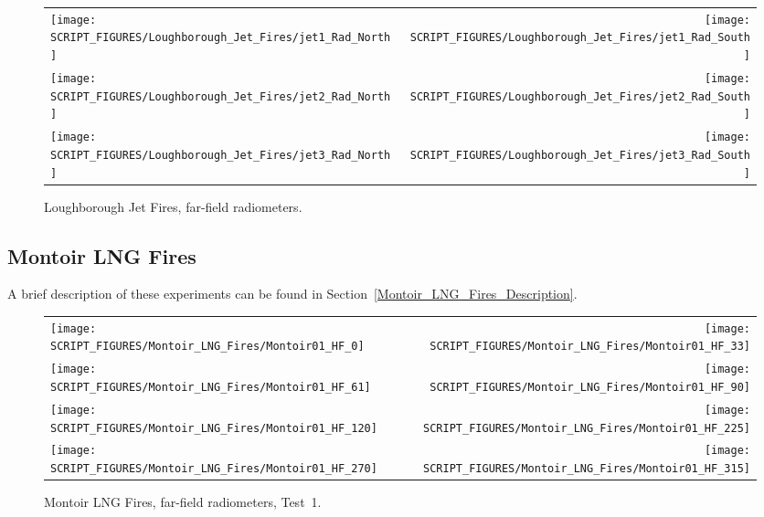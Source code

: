 \begin{figure}[p]
\begin{tabular*}{\textwidth}{l@{\extracolsep{\fill}}r}
\texttt{[image: SCRIPT\_FIGURES/Loughborough\_Jet\_Fires/jet1\_Rad\_North]} & 
\texttt{[image: SCRIPT\_FIGURES/Loughborough\_Jet\_Fires/jet1\_Rad\_South]} \\
\texttt{[image: SCRIPT\_FIGURES/Loughborough\_Jet\_Fires/jet2\_Rad\_North]} & 
\texttt{[image: SCRIPT\_FIGURES/Loughborough\_Jet\_Fires/jet2\_Rad\_South]} \\
\texttt{[image: SCRIPT\_FIGURES/Loughborough\_Jet\_Fires/jet3\_Rad\_North]} & 
\texttt{[image: SCRIPT\_FIGURES/Loughborough\_Jet\_Fires/jet3\_Rad\_South]} 
\end{tabular*}
\caption[Loughborough Jet Fires, far-field radiometers]{Loughborough Jet Fires, far-field radiometers.}
\label{Loughborough_Rad}
\end{figure}


\clearpage

\subsection{Montoir LNG Fires}
\label{Montoir_LNG_Fires_Heat_Flux}

A brief description of these experiments can be found in Section~\ref{Montoir_LNG_Fires_Description}.

\newpage

\begin{figure}[p]
\begin{tabular*}{\textwidth}{l@{\extracolsep{\fill}}r}
\texttt{[image: SCRIPT\_FIGURES/Montoir\_LNG\_Fires/Montoir01\_HF\_0]} &
\texttt{[image: SCRIPT\_FIGURES/Montoir\_LNG\_Fires/Montoir01\_HF\_33]} \\
\texttt{[image: SCRIPT\_FIGURES/Montoir\_LNG\_Fires/Montoir01\_HF\_61]} &
\texttt{[image: SCRIPT\_FIGURES/Montoir\_LNG\_Fires/Montoir01\_HF\_90]} \\
\texttt{[image: SCRIPT\_FIGURES/Montoir\_LNG\_Fires/Montoir01\_HF\_120]} &
\texttt{[image: SCRIPT\_FIGURES/Montoir\_LNG\_Fires/Montoir01\_HF\_225]} \\
\texttt{[image: SCRIPT\_FIGURES/Montoir\_LNG\_Fires/Montoir01\_HF\_270]} &
\texttt{[image: SCRIPT\_FIGURES/Montoir\_LNG\_Fires/Montoir01\_HF\_315]} 
\end{tabular*}
\caption[Montoir LNG Fires, far-field radiometers, Test~1]{Montoir LNG Fires, far-field radiometers, Test~1.}
\label{Montoir_HF_1}
\end{figure}

